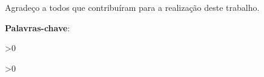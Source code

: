 \documentclass[
    12pt,               %
    oneside,            %
    a4paper,            %
    chapter=TITLE,      %
    section=TITLE,      %
    english,            %
    brazil              %
]{abntex2}
\begin{document}

\frenchspacing

\pretextual

\imprimircapa

\imprimirfolhaderosto

%     

\imprimirfolhadabanca

\begin{agradecimentos}
Agradeço a todos que contribuíram para a realização deste trabalho.

\end{agradecimentos}


\begin{resumo}
    \imprimirresumo
    \par
    \noindent \textbf{Palavras-chave}: \imprimirpalavraschave
\end{resumo}

\ifnum{}>0
    \listoffigures*
    \cleardoublepage
\fi

\ifnum{}>0
    \listofquadros*
    \cleardoublepage
\fi
\end{document}
